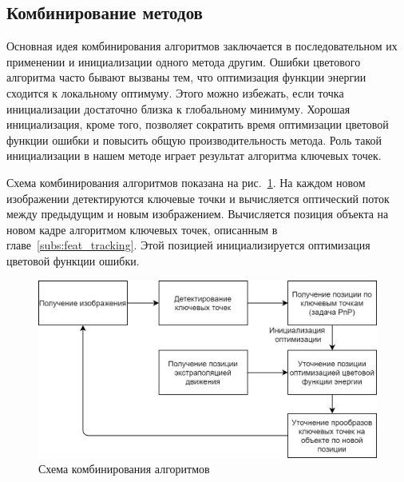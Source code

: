 
\subsection{Комбинирование методов}


Основная идея комбинирования алгоритмов заключается в последовательном их
применении и инициализации одного метода другим.
Ошибки цветового алгоритма часто бывают вызваны тем, что оптимизация функции
энергии сходится к локальному оптимуму.
Этого можно избежать, если точка инициализации достаточно близка к глобальному
минимуму.
Хорошая инициализация, кроме того, позволяет сократить время оптимизации
цветовой функции ошибки и повысить общую производительность метода.
Роль такой инициализации в нашем методе играет результат алгоритма ключевых
точек.

\newcommand{\FeatAlg}{\ensuremath{F_{\text{\it feat}}}}
\newcommand{\ColorAlg}{\ensuremath{F_{\text {\it color}}}}
\newcommand{\PoseOnFrame}[1]{\ensuremath{\Pose^{\left( #1 \right)}}}
\newcommand{\PoseI}{\ensuremath{\PoseOnFrame{i}}}
\newcommand{\FeatPoseI}{\ensuremath{\PoseI_{\text {\it feat}}}}
\newcommand{\FeatPose}{\ensuremath{\Pose_{\text {\it feat}}}}

\newcommand{\XOld}{\ensuremath{\vect{x_{\text {\it old}}}}}
\newcommand{\XNew}{\ensuremath{\vect{x_{\text{\it new}}}}}
\newcommand{\ReprErr}[1]{\ensuremath{\vect{e}( #1 )}}

Схема комбинирования алгоритмов показана на рис.~\ref{fig:combining_schema}.
На каждом новом изображении детектируются ключевые точки и вычисляется
оптический поток между предыдущим и новым изображением.
Вычисляется позиция объекта на новом кадре алгоритмом ключевых точек, описанным
в главе~\ref{subs:feat_tracking}.
Этой позицией инициализируется оптимизация цветовой функции ошибки.

\begin{figure}[t]
\centering
\includegraphics[width=\textwidth]{fig/combining_schema.png}
\caption{
Схема комбинирования алгоритмов
} \label{fig:combining_schema}
\end{figure}

